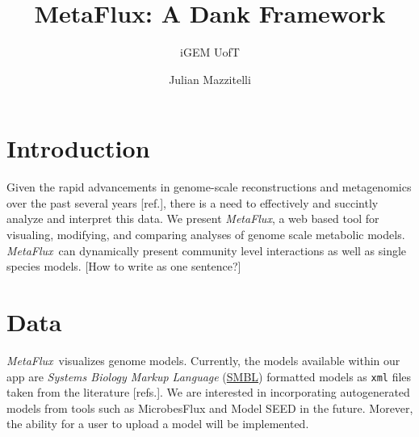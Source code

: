 

\graphicspath{{./figures/}}

\hypersetup{
    colorlinks=true,
    linkcolor=black,
    urlcolor=cyan
}

\title{MetaFlux: A Dank Framework}
\author{iGEM UofT}
\date{Julian Mazzitelli}

\renewcommand*\contentsname{}

\def\Blender{\href{https://www.blender.org/}{Blender}}

\def\MetaFlux{\textit{MetaFlux}}
\def\SMBL{\href{http://sbml.org/Main_Page}{SMBL}}



\maketitle




\section{Introduction}

Given the rapid advancements in genome-scale reconstructions and metagenomics
over the past several years [ref.], there is a need to effectively and succintly
analyze and interpret this data. We present \MetaFlux, a web based tool for
visualing, modifying, and comparing analyses of genome scale metabolic models.
\MetaFlux\ can dynamically present community level interactions as well as single
species models. [How to write as one sentence?]

\section{Data}

\MetaFlux\ visualizes genome models. Currently, the models available within our
app are \textit{Systems Biology Markup Language} (\SMBL) formatted models as
\texttt{xml} files taken from the literature [refs.]. We are interested in
incorporating autogenerated models from tools such as MicrobesFlux and Model
SEED in the future. Morever, the ability for a user to upload a model will be
implemented.

